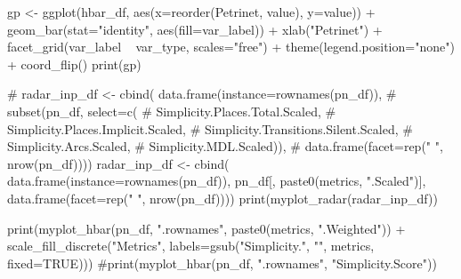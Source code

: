 \documentclass[]{article}
\newenvironment{Shaded}{\begin{snugshade}}{\end{snugshade}}
\newcommand{\KeywordTok}[1]{\textcolor[rgb]{0.94,0.87,0.69}{{#1}}}
\newcommand{\DataTypeTok}[1]{\textcolor[rgb]{0.87,0.87,0.75}{{#1}}}
\newcommand{\StringTok}[1]{\textcolor[rgb]{0.80,0.58,0.58}{{#1}}}
\newcommand{\CommentTok}[1]{\textcolor[rgb]{0.50,0.62,0.50}{{#1}}}
\newcommand{\OtherTok}[1]{\textcolor[rgb]{0.94,0.94,0.56}{{#1}}}
\newcommand{\NormalTok}[1]{\textcolor[rgb]{0.80,0.80,0.80}{{#1}}}
\begin{document}
\begin{Shaded}
\begin{Highlighting}[]
    \NormalTok{gp <-}\StringTok{ }\KeywordTok{ggplot}\NormalTok{(hbar_df, }\KeywordTok{aes}\NormalTok{(}\DataTypeTok{x=}\KeywordTok{reorder}\NormalTok{(Petrinet, value), }\DataTypeTok{y=}\NormalTok{value)) +}\StringTok{       }
\StringTok{            }\KeywordTok{geom_bar}\NormalTok{(}\DataTypeTok{stat=}\StringTok{"identity"}\NormalTok{, }\KeywordTok{aes}\NormalTok{(}\DataTypeTok{fill=}\NormalTok{var_label)) +}\StringTok{ }\KeywordTok{xlab}\NormalTok{(}\StringTok{"Petrinet"}\NormalTok{) +}\StringTok{ }
\StringTok{            }\KeywordTok{facet_grid}\NormalTok{(var_label ~}\StringTok{ }\NormalTok{var_type, }\DataTypeTok{scales=}\StringTok{"free"}\NormalTok{) +}\StringTok{ }
\StringTok{            }\KeywordTok{theme}\NormalTok{(}\DataTypeTok{legend.position=}\StringTok{"none"}\NormalTok{) +}\StringTok{ }\KeywordTok{coord_flip}\NormalTok{()}
    \KeywordTok{print}\NormalTok{(gp)}

\CommentTok{#     radar_inp_df <- cbind( data.frame(instance=rownames(pn_df)),}
\CommentTok{#                                     subset(pn_df, select=c( }
\CommentTok{#                                         Simplicity.Places.Total.Scaled,}
\CommentTok{#                                         Simplicity.Places.Implicit.Scaled,}
\CommentTok{#                                         Simplicity.Transitions.Silent.Scaled,}
\CommentTok{#                                         Simplicity.Arcs.Scaled,}
\CommentTok{#                                         Simplicity.MDL.Scaled)),}
\CommentTok{#                                     data.frame(facet=rep(" ", nrow(pn_df))))}
    \NormalTok{radar_inp_df <-}\StringTok{ }\KeywordTok{cbind}\NormalTok{( }\KeywordTok{data.frame}\NormalTok{(}\DataTypeTok{instance=}\KeywordTok{rownames}\NormalTok{(pn_df)),}
                                    \NormalTok{pn_df[, }\KeywordTok{paste0}\NormalTok{(metrics, }\StringTok{".Scaled"}\NormalTok{)],}
                                    \KeywordTok{data.frame}\NormalTok{(}\DataTypeTok{facet=}\KeywordTok{rep}\NormalTok{(}\StringTok{" "}\NormalTok{, }\KeywordTok{nrow}\NormalTok{(pn_df))))}
    \KeywordTok{print}\NormalTok{(}\KeywordTok{myplot_radar}\NormalTok{(radar_inp_df))}

    \KeywordTok{print}\NormalTok{(}\KeywordTok{myplot_hbar}\NormalTok{(pn_df, }\StringTok{".rownames"}\NormalTok{, }\KeywordTok{paste0}\NormalTok{(metrics, }\StringTok{".Weighted"}\NormalTok{)) +}\StringTok{ }
\StringTok{        }\KeywordTok{scale_fill_discrete}\NormalTok{(}\StringTok{"Metrics"}\NormalTok{, }
                            \DataTypeTok{labels=}\KeywordTok{gsub}\NormalTok{(}\StringTok{"Simplicity."}\NormalTok{, }\StringTok{""}\NormalTok{, metrics, }\DataTypeTok{fixed=}\OtherTok{TRUE}\NormalTok{)))}
    \CommentTok{#print(myplot_hbar(pn_df, ".rownames", "Simplicity.Score"))}
    

\end{Highlighting}
\end{Shaded}
\end{document}
